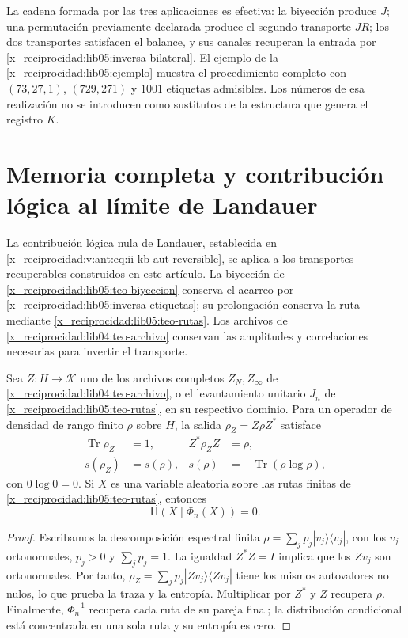 La cadena formada por las tres aplicaciones es efectiva: la biyección
produce \(J\); una permutación previamente declarada produce el
segundo transporte \(JR\); los dos transportes satisfacen el
balance, y sus canales recuperan la entrada por
\eqref{x_reciprocidad:lib05:inversa-bilateral}. El ejemplo de la
\cref{x_reciprocidad:lib05:ejemplo} muestra el procedimiento completo con
\((73,27,1)\), \((729,271)\) y \(1001\) etiquetas admisibles.
Los números de esa realización no se introducen como sustitutos de
la estructura que genera el registro \(K\).

\section{Memoria completa y contribución lógica al límite de Landauer}
\label{x_reciprocidad:landauer:puente-archivo}

La contribución lógica nula de Landauer, establecida en
\eqref{x_reciprocidad:v:ant:eq:ii-kb-aut-reversible}, se aplica a los transportes
recuperables construidos en este artículo. La biyección de
\cref{x_reciprocidad:lib05:teo-biyeccion} conserva el acarreo por
\eqref{x_reciprocidad:lib05:inversa-etiquetas}; su prolongación conserva la ruta
mediante \cref{x_reciprocidad:lib05:teo-rutas}. Los archivos de
\cref{x_reciprocidad:lib04:teo-archivo} conservan las amplitudes y correlaciones
necesarias para invertir el transporte.

\begin{corollary}
\label{x_reciprocidad:landauer:cor-archivo}
Sea \(Z:H\to\mathcal K\) uno de los archivos completos
\(Z_N,Z_\infty\) de \cref{x_reciprocidad:lib04:teo-archivo}, o el levantamiento
unitario \(J_n\) de \cref{x_reciprocidad:lib05:teo-rutas}, en su respectivo dominio.
Para un operador de densidad de rango finito \(\rho\) sobre \(H\),
la salida \(\rho_Z=Z\rho Z^*\) satisface
\begin{align}
 \operatorname{Tr}\rho_Z&=1,& Z^*\rho_ZZ&=\rho,\\
 s(\rho_Z)&=s(\rho),&
 s(\rho)&=-\operatorname{Tr}(\rho\log\rho),
 \label{x_reciprocidad:landauer:espectro}
\end{align}
con \(0\log0=0\). Si \(X\) es una variable aleatoria sobre las rutas
finitas de \cref{x_reciprocidad:lib05:teo-rutas}, entonces
\begin{equation}
 \mathsf H(X\mid\Phi_n(X))=0.
 \label{x_reciprocidad:landauer:recuperacion-ruta}
\end{equation}
\end{corollary}
\begin{proof}
Escribamos la descomposición espectral finita
\(\rho=\sum_jp_j|v_j\rangle\langle v_j|\), con los \(v_j\)
ortonormales, \(p_j>0\) y \(\sum_jp_j=1\). La igualdad
\(Z^*Z=I\) implica que los \(Zv_j\) son ortonormales. Por tanto,
\(\rho_Z=\sum_jp_j|Zv_j\rangle\langle Zv_j|\) tiene los mismos
autovalores no nulos, lo que prueba la traza y la entropía.
Multiplicar por \(Z^*\) y \(Z\) recupera \(\rho\). Finalmente,
\(\Phi_n^{-1}\) recupera cada ruta de su pareja final; la
distribución condicional está concentrada en una sola ruta y su
entropía es cero.
\end{proof}

